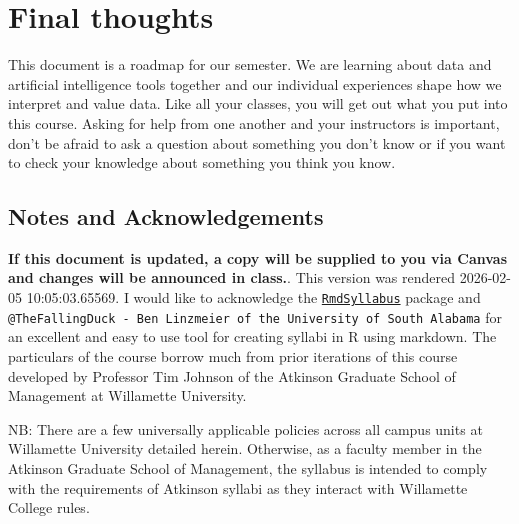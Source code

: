 \documentclass[11pt,]{article}
\begin{document}
\section{Final thoughts}\label{final-thoughts}

This document is a roadmap for our semester. We are learning about data
and artificial intelligence tools together and our individual
experiences shape how we interpret and value data. Like all your
classes, you will get out what you put into this course. Asking for help
from one another and your instructors is important, don't be afraid to
ask a question about something you don't know or if you want to check
your knowledge about something you think you know.

\subsection{Notes and
Acknowledgements}\label{notes-and-acknowledgements}

\textbf{If this document is updated, a copy will be supplied to you via
Canvas and changes will be announced in class.}. This version was
rendered 2026-02-05 10:05:03.65569. I would like to acknowledge the
\href{https://github.com/thefallingduck/RmdSyllabus}{\texttt{RmdSyllabus}}
package and
\texttt{@TheFallingDuck\ -\ Ben\ Linzmeier\ of\ the\ University\ of\ South\ Alabama}
for an excellent and easy to use tool for creating syllabi in R using
markdown. The particulars of the course borrow much from prior
iterations of this course developed by Professor Tim Johnson of the
Atkinson Graduate School of Management at Willamette University.

NB: There are a few universally applicable policies across all campus
units at Willamette University detailed herein. Otherwise, as a faculty
member in the Atkinson Graduate School of Management, the syllabus is
intended to comply with the requirements of Atkinson syllabi as they
interact with Willamette College rules.
\end{document}
